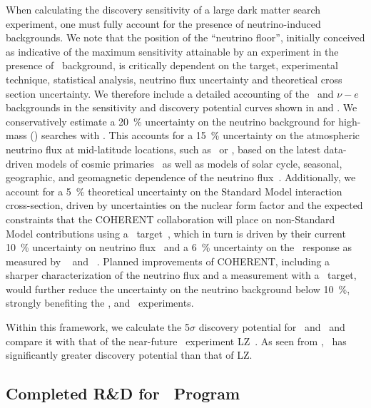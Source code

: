 When calculating the discovery sensitivity of a large dark matter search experiment, one must fully account for the presence of neutrino-induced backgrounds.  We note that the position of the ``neutrino floor'', initially conceived as indicative of the maximum sensitivity attainable by an experiment in the presence of \CEnNS\ background, is critically dependent on the target, experimental technique, statistical analysis, neutrino flux uncertainty and theoretical cross section uncertainty. We therefore include a detailed accounting of the \CEnNS\ and $\nu-e$ backgrounds in the sensitivity and discovery potential curves shown in  and . We conservatively estimate a \SI{20}{\percent} uncertainty on the neutrino background for high-mass (\DSkHighMassThreshold) searches with \Argo.  This accounts for a \SI{15}{\percent} uncertainty on the atmospheric neutrino flux at mid-latitude locations, such as \SNOLAB\ or \LNGS, based on the latest data-driven models of cosmic primaries~\cite{Evans:2017hu} as well as models of solar cycle, seasonal, geographic, and geomagnetic dependence of the neutrino flux~\cite{Honda:2011ey,Barr:2006ih}.  Additionally, we account for a \SI{5}{\percent} theoretical uncertainty on the Standard Model interaction cross-section, driven by uncertainties on the nuclear form factor and the expected constraints that the COHERENT collaboration will place on non-Standard Model contributions using a \LAr\ target~\cite{Tayloe:2018jn}, which in turn is driven by their current \SI{10}{\percent} uncertainty on neutrino flux~\cite{Akimov:2017bs} and a \SI{6}{\percent} uncertainty on the \LAr\ response as measured by \SCENE~\cite{Cao:2015ks,Alexander:2013ke} and \ARIS~\cite{Agnes:2018cn}.  Planned improvements of COHERENT, including a sharper characterization of the neutrino flux and a measurement with a \LAr\ target, would further reduce the uncertainty on the neutrino background below \SI{10}{\percent}, strongly benefiting the \DSks, and \Argo\ experiments.

Within this framework, we calculate the 5$\sigma$ discovery potential for \DSks\ and \Argo\ and compare it with that of the near-future \LXe\ experiment LZ~\cite{Dobson:2018us}.  As seen from , \DSks\ has significantly greater discovery potential than that of LZ.


\subsection{Completed R\&D for \DSks\ Program}
\label{sec:technologies}

